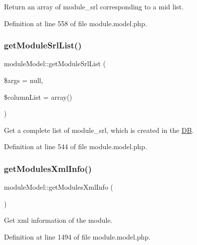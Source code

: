 Return an array of module\+\_\+srl corresponding to a mid list. 



Definition at line 558 of file module.\+model.\+php.

\hypertarget{classmoduleModel_ae63e7e551002fac4c01a330a76dd7244}{}\label{classmoduleModel_ae63e7e551002fac4c01a330a76dd7244} 
\subsubsection{\texorpdfstring{get\+Module\+Srl\+List()}{getModuleSrlList()}}
{\footnotesize\ttfamily module\+Model\+::get\+Module\+Srl\+List (\begin{DoxyParamCaption}\item[{}]{\$args = {\ttfamily null},  }\item[{}]{\$column\+List = {\ttfamily array()} }\end{DoxyParamCaption})}



Get a complete list of module\+\_\+srl, which is created in the \hyperlink{classDB}{DB}. 



Definition at line 544 of file module.\+model.\+php.

\hypertarget{classmoduleModel_ab0740093a121db65a8d65777fdcd8f00}{}\label{classmoduleModel_ab0740093a121db65a8d65777fdcd8f00} 
\subsubsection{\texorpdfstring{get\+Modules\+Xml\+Info()}{getModulesXmlInfo()}}
{\footnotesize\ttfamily module\+Model\+::get\+Modules\+Xml\+Info (\begin{DoxyParamCaption}{ }\end{DoxyParamCaption})}



Get xml information of the module. 



Definition at line 1494 of file module.\+model.\+php.

\hypertarget{classmoduleModel_a6baa2faf83fc96fba51072276c9cb7c3}{}\label{classmoduleModel_a6baa2faf83fc96fba51072276c9cb7c3} 
